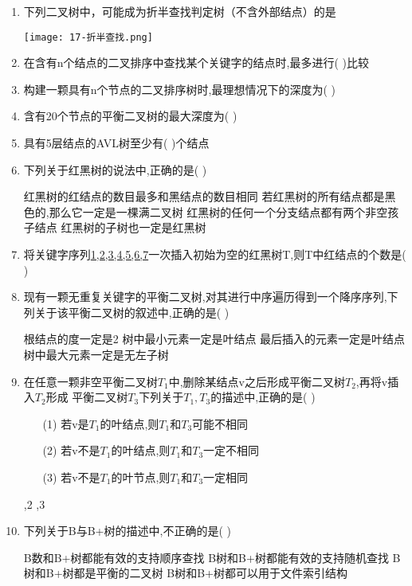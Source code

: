 \documentclass[12pt, a4paper, oneside, UTF8]{ctexbook}
\begin{document}
\begin{enumerate}
    \item \bl 下列二叉树中，可能成为折半查找判定树（不含外部结点）的是
    \begin{center}
    \texttt{[image: 17-折半查找.png]}
    \end{center}

    
    \item 在含有n个结点的二叉排序中查找某个关键字的结点时,最多进行(   )比较 
    \item 构建一颗具有n个节点的二叉排序树时,最理想情况下的深度为(   )
    \item 含有20个节点的平衡二叉树的最大深度为(   )
    \item 具有5层结点的AVL树至少有(   )个结点

    \item 下列关于红黑树的说法中,正确的是(   ) 
    \begin{choices}[1]
        \task 红黑树的红结点的数目最多和黑结点的数目相同
        \task 若红黑树的所有结点都是黑色的,那么它一定是一棵满二叉树
        \task 红黑树的任何一个分支结点都有两个非空孩子结点
        \task 红黑树的子树也一定是红黑树
    \end{choices}

    \item \bt 将关键字序列\underline{1,2,3,4,5,6,7}一次插入初始为空的红黑树T,则T中红结点的个数是(    ) 
    \item \bl 现有一颗无重复关键字的平衡二叉树,对其进行中序遍历得到一个降序序列,下列关于该平衡二叉树的叙述中,正确的是(  ) 
    \begin{choices}[2]
        \task 根结点的度一定是2
        \task 树中最小元素一定是叶结点
        \task 最后插入的元素一定是叶结点
        \task 树中最大元素一定是无左子树
    \end{choices}

    \item \bl 在任意一颗非空平衡二叉树$T_1$中,删除某结点v之后形成平衡二叉树$T_2$,再将v插入$T_2$形成
    平衡二叉树$T_3$下列关于$T_1,T_3$的描述中,正确的是(   )
    \begin{enumerate}
        \item [(1)] 若v是$T_1$的叶结点,则$T_1$和$T_3$可能不相同 
        \item [(2)] 若v不是$T_1$的叶结点,则$T_1$和$T_3$一定不相同
        \item [(3)] 若v不是$T_1$的叶节点,则$T_1$和$T_3$一定相同 
    \end{enumerate}
    \begin{choices}
        ,2
        ,3
    \end{choices}
    \item 下列关于B与B+树的描述中,不正确的是(   ) 
    \begin{choices}[2]
        \task B数和B+树都能有效的支持顺序查找
        \task B树和B+树都能有效的支持随机查找
        \task B树和B+树都是平衡的二叉树
        \task B树和B+树都可以用于文件索引结构
    \end{choices}


\end{enumerate}
\end{document}
